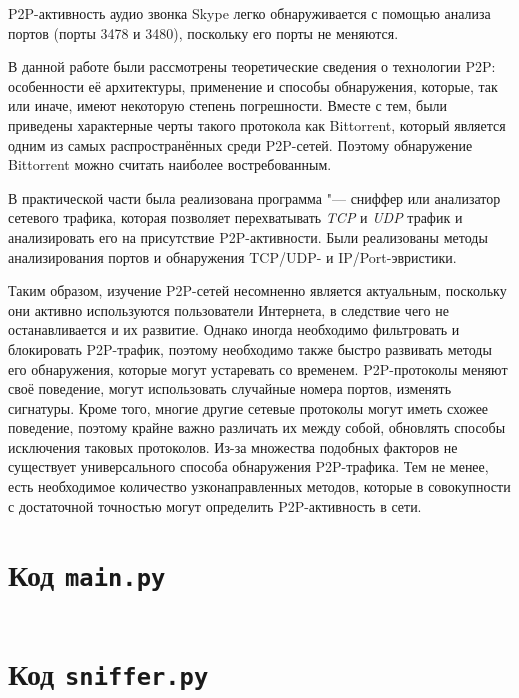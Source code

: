 \documentclass[bachelor, och, coursework]{SCWorks}
\begin{document}
P2P-активность аудио звонка Skype легко обнаруживается с помощью анализа портов (порты 3478 и 3480), поскольку его порты не меняются.

\conclusion
В данной работе были рассмотрены теоретические сведения о технологии P2P: особенности её архитектуры, применение
и способы обнаружения, которые, так или иначе, имеют некоторую степень погрешности. Вместе с тем, были приведены характерные черты такого протокола как Bittorrent, который является одним из самых распространённых среди P2P-сетей.
Поэтому обнаружение Bittorrent можно считать наиболее востребованным.

В практической части была реализована программа "--- сниффер или анализатор сетевого трафика, которая позволяет
перехватывать \textit{TCP} и \textit{UDP} трафик и анализировать его на присутствие P2P-активности. Были реализованы методы анализирования портов и обнаружения TCP/UDP- и IP/Port-эвристики.

Таким образом, изучение P2P-сетей несомненно является актуальным, поскольку они активно используются пользователи Интернета, в следствие чего не останавливается и их развитие. Однако иногда необходимо фильтровать и блокировать P2P-трафик, поэтому необходимо также быстро развивать методы его обнаружения, которые могут устаревать со временем. P2P-протоколы меняют своё поведение, могут использовать случайные номера портов, изменять сигнатуры. Кроме того, многие другие сетевые протоколы могут иметь схожее поведение, поэтому крайне важно различать их между собой, обновлять способы исключения таковых протоколов. Из-за множества подобных факторов не существует универсального способа обнаружения P2P-трафика. Тем не менее, есть необходимое количество узконаправленных методов, которые в совокупности с достаточной 
точностью могут определить P2P-активность в сети.

% 
% 

\appendix

    \section{Код \texttt{main.py}}
    \inputminted{python3}{code/sniffer/main.py}

    \section{Код \texttt{sniffer.py}}
    \inputminted{python3}{code/sniffer/sniffer.py}
\end{document}
